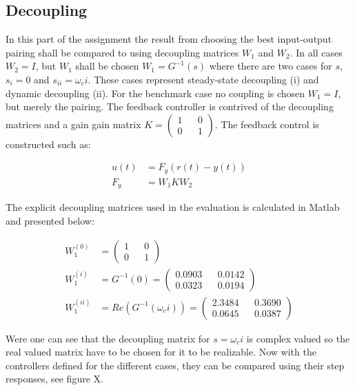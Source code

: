 \documentclass[a4paper, titlepage]{article}
\begin{document}
\subsection{Decoupling}
In this part of the assignment the result from choosing the best input-output pairing shall be compared to using decoupling matrices $W_1$ and $W_2$.
In all cases $W_2 = I$, but $W_1$ shall be chosen $W_1 = G^{-1}(s)$ where there are two cases for $s$, $s_i = 0$ and $s_{ii}=\omega_ci$.
These cases represent steady-state decoupling (i) and dynamic decoupling (ii).
For the benchmark case no coupling is chosen $W_1 = I$, but merely the pairing.
The feedback controller is contrived of the decoupling matrices and a gain gain matrix $K = \begin{pmatrix} 1 && 0 \\ 0 && 1 \end{pmatrix}$.
The feedback control is constructed such as:

\begin{equation}
\begin{split}
u(t) &= F_y(r(t) - y(t)) \\
F_y &= W_1KW_2
\end{split}
\end{equation}

The explicit decoupling matrices used in the evaluation is calculated in Matlab and presented below:

\begin{equation}
\begin{split}
W^{(0)}_1 &= 
\begin{pmatrix}
1 && 0 \\ 0 && 1
\end{pmatrix} \\
W^{(i)}_1 &= G^{-1}(0) = 
\begin{pmatrix}
0.0903 && 0.0142 \\ 0.0323 && 0.0194
\end{pmatrix} \\
W^{(ii)}_1 &= Re(G^{-1}(\omega_ci)) = 
\begin{pmatrix}
2.3484 && 0.3690 \\ 0.0645 && 0.0387
\end{pmatrix}
\end{split}
\end{equation}

Were one can see that the decoupling matrix for $s=\omega_ci$ is complex valued so the real valued matrix have to be chosen for it to be realizable.
Now with the controllers defined for the different cases, they can be compared using their step responses, see figure X.
\end{document}
